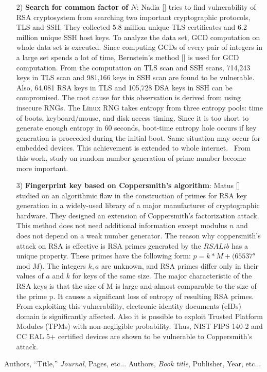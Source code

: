 \documentclass[a4paper]{article}
\begin{document}
\begin{enumerate}[label=]
       \item[2)] \textbf{Search for common factor of $N$}: Nadia [] tries to find vulnerability of RSA cryptosystem from searching two important cryptographic protocols, TLS and SSH. They collected 5.8 million unique TLS certificates and 6.2 million unique SSH host keys. To analyze the data set, GCD computation on whole data set is executed. Since computing GCDs of every pair of integers in a large set spends a lot of time, Bernstein's method [] is used for GCD computation. From the computation on TLS scan and SSH scans, 714,243 keys in TLS scan and 981,166 keys in SSH scan are found to be vulnerable. Also, 64,081 RSA keys in TLS and 105,728 DSA keys in SSH can be compromised. The root cause for this observation is derived from using insecure RNGs. The Linux RNG takes entropy from three entropy pools: time of boots, keyboard/mouse, and disk access timing. Since it is too short to generate enough entropy in 60 seconds, boot-time entropy hole occurs if key generation is proceeded during the initial boot. Same situation may occur for embedded devices. This achievement is extended to whole internet.~ From this work, study on random number generation of prime number become more important.
       
       \item[3)] \textbf{Fingerprint key based on Coppersmith's algorithm}: Matus [] studied on an algorithmic flaw in the construction of primes for RSA key generation in a widely-used library of a major manufacturer of cryptographic hardware. They designed an extension of Coppersmith's factorization attack. This method does not need additional information except modulus $n$ and does not depend on a weak number generator. The reason why coppersmith's attack on RSA is effective is RSA primes generated by the $RSALib$ has a unique property. These primes have the following form: $p=k*M + (65537^a$ mod $M$). The integers $k,a$ are unknown, and RSA primes differ only in their values of $a$ and $k$ for keys of the same size. The major characteristic of the RSA keys is that the size of M is large and almost comparable to the size of the prime p. It causes a significant loss of entropy of resulting RSA primes. From exploiting this vulnerability, electronic identity documents (eIDs) domain is significantly affected. Also it is possible to exploit Trusted Platform Modules (TPMs) with non-negligible probability. Thus, NIST FIPS 140-2 and CC EAL 5+ certified devices are shown to be vulnerable to Coppersmith's attack.
\end{enumerate}

\begin{thebibliography}{9}
Authors, ``Title,'' {\em Journal}, Pages, etc...
Authors, {\em Book title}, Publisher, Year, etc...
\end{thebibliography}
\end{document}
